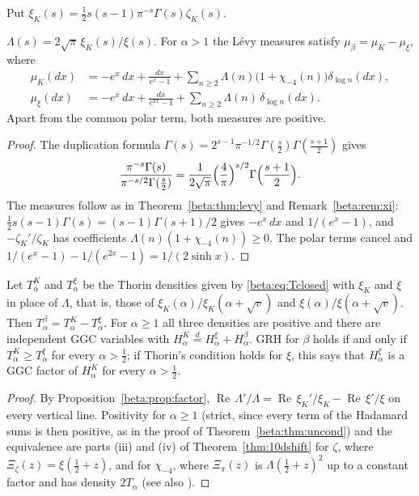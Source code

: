 Put $\xi_K(s)=\tfrac12s(s-1)\pi^{-s}\Gamma(s)\zeta_K(s)$.

\begin{proposition}[Factorisation]\label{beta:prop:factor}
$\Lambda(s)=2\sqrt\pi\,\xi_K(s)/\xi(s)$. For $\alpha>1$ the L\'evy measures satisfy $\mu_\beta=\mu_K-\mu_\xi$, where
\begin{align*}
\mu_K(dx)&=-e^x\,dx+\frac{dx}{e^x-1}+\sum_{n\ge2}\Lambda(n)\bigl(1+\chi_{-4}(n)\bigr)\delta_{\log n}(dx),\\
\mu_\xi(dx)&=-e^x\,dx+\frac{dx}{e^{2x}-1}+\sum_{n\ge2}\Lambda(n)\,\delta_{\log n}(dx).
\end{align*}
Apart from the common polar term, both measures are positive.
\end{proposition}

\begin{proof}
The duplication formula $\Gamma(s)=2^{s-1}\pi^{-1/2}\Gamma(\tfrac s2)\Gamma(\tfrac{s+1}2)$ gives
\[
\frac{\pi^{-s}\Gamma(s)}{\pi^{-s/2}\Gamma(\tfrac s2)}=\frac{1}{2\sqrt\pi}\Bigl(\frac4\pi\Bigr)^{s/2}\Gamma\Bigl(\frac{s+1}{2}\Bigr).
\]
The measures follow as in Theorem~\ref{beta:thm:levy} and Remark~\ref{beta:rem:xi}: $\tfrac12s(s-1)\Gamma(s)=(s-1)\Gamma(s+1)/2$ gives $-e^x\,dx$ and $1/(e^x-1)$, and $-\zeta_K'/\zeta_K$ has coefficients $\Lambda(n)(1+\chi_{-4}(n))\ge0$. The polar terms cancel and $1/(e^x-1)-1/(e^{2x}-1)=1/(2\sinh x)$.
\end{proof}

\begin{theorem}\label{beta:thm:dom}
Let $T^K_\alpha$ and $T^\xi_\alpha$ be the Thorin densities given by \eqref{beta:eq:Tclosed} with $\xi_K$ and $\xi$ in place of $\Lambda$, that is, those of $\xi_K(\alpha)/\xi_K(\alpha+\sqrt v)$ and $\xi(\alpha)/\xi(\alpha+\sqrt v)$. Then $T^\beta_\alpha=T^K_\alpha-T^\xi_\alpha$. For $\alpha\ge1$ all three densities are positive and there are independent GGC variables with $H^K_\alpha\overset{d}{=}H^\xi_\alpha+H^\beta_\alpha$. GRH for $\beta$ holds if and only if $T^K_\alpha\ge T^\xi_\alpha$ for every $\alpha>\tfrac12$; if Thorin's condition holds for $\xi$, this says that $H^\xi_\alpha$ is a GGC factor of $H^K_\alpha$ for every $\alpha>\tfrac12$.
\end{theorem}

\begin{proof}
By Proposition~\ref{beta:prop:factor}, $\operatorname{Re}\,\Lambda'/\Lambda=\operatorname{Re}\,\xi_K'/\xi_K-\operatorname{Re}\,\xi'/\xi$ on every vertical line. Positivity for $\alpha\ge1$ (strict, since every term of the Hadamard sums is then positive, as in the proof of Theorem~\ref{beta:thm:uncond}) and the equivalence are parts (iii) and (iv) of Theorem~\ref{thm:10dshift} for $\zeta$, where $\Xi_\zeta(z)=\xi(\tfrac12+z)$, and for $\chi_{-4}$, where $\Xi_\pi(z)$ is $\Lambda(\tfrac12+z)^2$ up to a constant factor and has density $2T_\alpha$ (see also \cite[Theorem~30 and Remark~32]{polson2018vdp}).
\end{proof}

